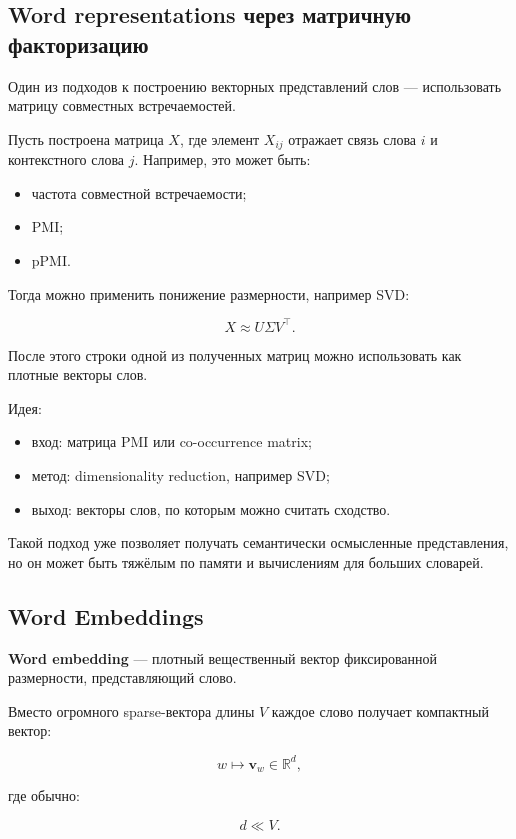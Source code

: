 \documentclass[a4paper,12pt]{article}
\begin{document}
\subsection{Word representations через матричную факторизацию}

Один из подходов к построению векторных представлений слов --- использовать матрицу совместных встречаемостей.

Пусть построена матрица \(X\), где элемент \(X_{ij}\) отражает связь слова \(i\) и контекстного слова \(j\). Например, это может быть:

\begin{itemize}
    \item частота совместной встречаемости;
    \item PMI;
    \item pPMI.
\end{itemize}

Тогда можно применить понижение размерности, например SVD:

\[
X \approx U \Sigma V^\top.
\]

После этого строки одной из полученных матриц можно использовать как плотные векторы слов.

Идея:

\begin{itemize}
    \item вход: матрица PMI или co-occurrence matrix;
    \item метод: dimensionality reduction, например SVD;
    \item выход: векторы слов, по которым можно считать сходство.
\end{itemize}

Такой подход уже позволяет получать семантически осмысленные представления, но он может быть тяжёлым по памяти и вычислениям для больших словарей.

\subsection{Word Embeddings}

\textbf{Word embedding} --- плотный вещественный вектор фиксированной размерности, представляющий слово.

Вместо огромного sparse-вектора длины \(V\) каждое слово получает компактный вектор:

\[
w \mapsto \bm{v}_w \in \mathbb{R}^d,
\]

где обычно:

\[
d \ll V.
\]
\end{document}
